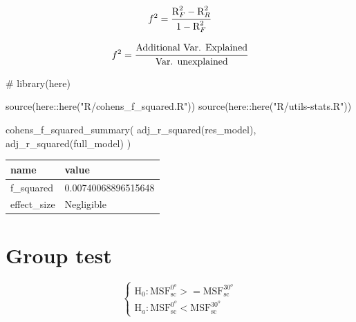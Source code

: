 \documentclass[
  12pt,
  a4paper,
  oneside]{tesesusp}
\newenvironment{Shaded}{\begin{snugshade}}{\end{snugshade}}
\newcommand{\CommentTok}[1]{\textcolor[rgb]{0.37,0.37,0.37}{#1}}
\newcommand{\FunctionTok}[1]{\textcolor[rgb]{0.28,0.35,0.67}{#1}}
\newcommand{\NormalTok}[1]{\textcolor[rgb]{0.00,0.23,0.31}{#1}}
\newcommand{\SpecialCharTok}[1]{\textcolor[rgb]{0.37,0.37,0.37}{#1}}
\newcommand{\StringTok}[1]{\textcolor[rgb]{0.13,0.47,0.30}{#1}}
\begin{document}
\[
f^{2} = \cfrac{\text{R}^{2}_{F} - \text{R}^{2}_{R}}{1 - \text{R}^{2}_{F}}
\]

\[
f^{2} = \cfrac{\text{Additional Var. Explained}}{\text{Var. unexplained}}
\]

\begin{Shaded}
\begin{Highlighting}[numbers=left,,]
\CommentTok{\# library(here)}

\FunctionTok{source}\NormalTok{(here}\SpecialCharTok{::}\FunctionTok{here}\NormalTok{(}\StringTok{"R/cohens\_f\_squared.R"}\NormalTok{))}
\FunctionTok{source}\NormalTok{(here}\SpecialCharTok{::}\FunctionTok{here}\NormalTok{(}\StringTok{"R/utils{-}stats.R"}\NormalTok{))}

\FunctionTok{cohens\_f\_squared\_summary}\NormalTok{(}
  \FunctionTok{adj\_r\_squared}\NormalTok{(res\_model), }
  \FunctionTok{adj\_r\_squared}\NormalTok{(full\_model)}
\NormalTok{  )}
\end{Highlighting}
\end{Shaded}

\begin{table}
\centering
\begin{tabular}{l|l}
\hline
name & value\\
\hline
f\_squared & 0.00740068896515648\\
\hline
effect\_size & Negligible\\
\hline
\end{tabular}
\end{table}

\hypertarget{group-test}{%
\section{Group test}\label{group-test}}

\[
\begin{cases}
\text{H}_{0}: \text{MSF}^{0^{o}}_{\text{sc}} >= \text{MSF}^{30^{o}}_{\text{sc}} \\
\text{H}_{a}: \text{MSF}^{0^{o}}_{\text{sc}} < \text{MSF}^{30^{o}}_{\text{sc}}
\end{cases}
\]
\end{document}
